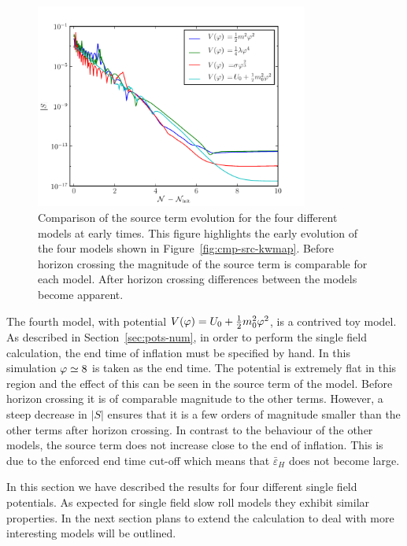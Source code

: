 \begin{figure}[htbp]
 \centering
 \includegraphics[width=0.8\textwidth]{numerical/graphs/cmp_src_kwmap_zoom-large}
 \caption[Comparison of Source Term at Early Times]{Comparison of the
source term evolution for the four different models at early times. This figure
highlights the early evolution of the four models shown in
Figure~\ref{fig:cmp-src-kwmap}. Before horizon crossing the magnitude of the source
term is comparable for each model. After horizon crossing differences between the
models become apparent.}
\label{fig:cmp-src-zoom-kwmap}
\end{figure}
% 

The fourth model, with potential $V(\varphi)=U_0 + \frac{1}{2} m_0^2 \varphi^2$, is a contrived toy model.
As described in Section~\ref{sec:pots-num}, in order to perform the single field
calculation, the end time of inflation must be specified by hand. In this simulation
$\varphi\simeq 8$
is taken as the end time. The potential is extremely flat in this region and the
effect of this can
be seen in the source term of the model. Before horizon crossing it is of comparable magnitude to
the other terms. However, a steep decrease in $|S|$ ensures that it is a few orders
of magnitude
smaller than
the other terms after horizon crossing. In contrast to the behaviour of the other models, the source
term does not increase close to the end of inflation. This is due to the enforced end time cut-off
which means that $\bar{\varepsilon}_H$ does not become large.

In this section we have described the results for four different single field potentials. As
expected for single field slow roll models they exhibit similar properties. In the next section
plans to extend the calculation to deal with more interesting models will be outlined.

